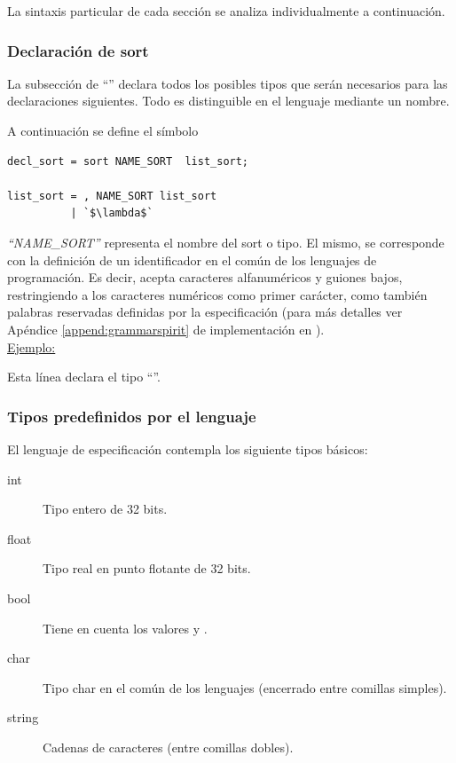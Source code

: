 La sintaxis particular de cada sección se analiza individualmente a continuación.

\subsubsection{Declaración de sort}
La subsección de ``'' declara todos los posibles tipos que serán necesarios para las declaraciones siguientes. Todo  es distinguible en el lenguaje mediante un nombre.

A continuación se define el símbolo 

\begin{lstlisting}[frame=shadowbox, language=specmag, linewidth=8cm]
decl_sort = sort NAME_SORT  list_sort;

list_sort = , NAME_SORT list_sort
          | `$\lambda$`
\end{lstlisting}

\textit{``NAME\_SORT''} representa el nombre del sort o tipo. El mismo, se corresponde con la definición de un identificador en el común de los lenguajes de programación. Es decir, acepta caracteres alfanuméricos y guiones bajos, restringiendo a los caracteres numéricos como primer carácter, como también palabras reservadas definidas por la especificación (para más detalles ver Apéndice \ref{append:grammarspirit} de implementación en \spirit).\\

\underline{Ejemplo:} \begin{center}  \end{center}
\vspace{0.2cm}
Esta línea declara el tipo ``''.

\subsubsection{Tipos predefinidos por el lenguaje}
\label{sec:typepredefined}

El lenguaje de especificación contempla los siguiente tipos básicos:

\begin{description}
\item [int] Tipo entero de 32 bits.

\item [float] Tipo real en punto flotante de 32 bits.

\item [bool] Tiene en cuenta los valores  y .

\item [char] Tipo char en el común de los lenguajes (encerrado entre comillas simples).

\item [string] Cadenas de caracteres (entre comillas dobles).
\end{description}


